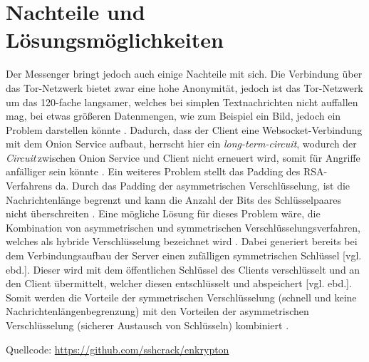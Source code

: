 \documentclass[a4paper,ngerman, headheight=28pt,12pt]{scrartcl}
\newcommand{\vcite}[1]{\cite[vgl.][]{#1}}
\newcommand{\vebd}{[vgl. ebd.]}
\newcommand{\circuit}{\textit{Circuit\,}}
\begin{document}
\section{Nachteile und Lösungsmöglichkeiten}
Der Messenger bringt jedoch auch einige Nachteile mit sich. Die Verbindung über das Tor-Netzwerk bietet zwar eine hohe Anonymität, jedoch ist das Tor-Netzwerk um das 120-fache langsamer, welches bei simplen Textnachrichten nicht auffallen mag, bei etwas größeren Datenmengen, wie zum Beispiel ein Bild, jedoch ein Problem darstellen könnte \vcite{TorPerformance}. Dadurch, dass der Client eine Websocket-Verbindung mit dem Onion Service aufbaut, herrscht hier ein \textit{long-term-circuit}, wodurch der \circuit zwischen Onion Service und Client nicht erneuert wird, somit für Angriffe anfälliger sein könnte \vcite{FAQCircuitLifetime}. Ein weiteres Problem stellt das Padding des RSA-Verfahrens da. Durch das Padding der asymmetrischen Verschlüsselung, ist die Nachrichtenlänge begrenzt und kann die Anzahl der Bits des Schlüsselpaares nicht überschreiten \vcite{OpensslRsaMaxLength}. Eine mögliche Lösung für dieses Problem wäre, die Kombination von asymmetrischen und symmetrischen Verschlüsselungsverfahren, welches als hybride Verschlüsselung bezeichnet wird \vcite{HybridEncryption}. Dabei generiert bereits bei dem Verbindungsaufbau der Server einen zufälligen symmetrischen Schlüssel \vebd. Dieser wird mit dem öffentlichen Schlüssel des Clients verschlüsselt und an den Client übermittelt, welcher diesen entschlüsselt und abspeichert \vebd.
Somit werden die Vorteile der symmetrischen Verschlüsselung (schnell und keine Nachrichtenlängenbegrenzung) mit den Vorteilen der asymmetrischen Verschlüsselung (sicherer Austausch von Schlüsseln) kombiniert \vcite{HybridTechnopedia}.

\pagebreak
\nolinenumbers{}
\printbibliography[notkeyword={figure}]
\label{LastPageDoc}

\pagebreak
{}%
\appendix
\printbibliography[heading=subbibliography,title={Anhang},keyword={figure}]
Quellcode: \href{https://github.com/sshcrack/enkrypton}{https://github.com/sshcrack/enkrypton}
\end{document}
